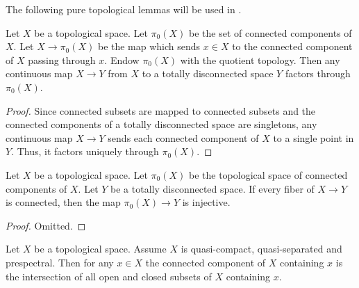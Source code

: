 The following pure topological lemmas will be used in .

\begin{lemma}
  \label{thm:pi0-to-totally-disconnected}
  Let \(X\) be a topological space. Let \(\pi_0(X)\) be the set of connected components of \(X\). Let \(X \to \pi_0(X)\) be the map which sends \(x \in X\) to the connected component of \(X\) passing through \(x\). Endow \(\pi_0(X)\) with the quotient topology. Then %
  any continuous map \(X \to Y\) from \(X\) to a totally disconnected space \(Y\) factors through \(\pi_0(X)\).
\end{lemma}

\begin{proof}
  Since connected subsets are mapped to connected subsets and the connected components of a totally disconnected space are singletons, any continuous map \(X \to Y\) sends each connected component of \(X\) to a single point in \(Y\). Thus, it factors uniquely through \(\pi_0(X)\).
\end{proof}

\begin{lemma}
  \label{thm:pi0-to-totally-disconnected-injective}
  Let \(X\) be a topological space. Let \(\pi_0(X)\) be the topological space of connected components of \(X\). Let \(Y\) be a totally disconnected space. If every fiber of \(X \to Y\) is connected, then the map \(\pi_0(X) \to Y\) is injective.
\end{lemma}

\begin{proof}
  Omitted.
\end{proof}

\begin{lemma}
  \label{thm:connected-component-intersection-closed-open}
  Let $X$ be a topological space. Assume $X$ is quasi-compact, quasi-separated
  and prespectral. Then for any $x \in X$ the connected component of $X$ containing $x$ is
  the intersection of all open and closed subsets of $X$ containing $x$.
\end{lemma}

